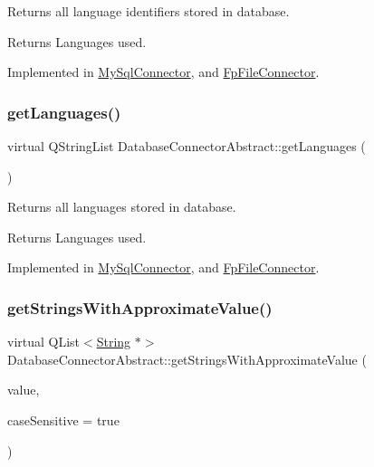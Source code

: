 Returns all language identifiers stored in database. 

\begin{DoxyReturn}{Returns}
Languages used. 
\end{DoxyReturn}


Implemented in \mbox{\hyperlink{classMySqlConnector_a3493828360c7edd217461e040fc1b00e}{My\+Sql\+Connector}}, and \mbox{\hyperlink{classFpFileConnector_a290016844ec3093b1c58db33fc86cd0a}{Fp\+File\+Connector}}.

\mbox{\label{classDatabaseConnectorAbstract_a77ff263d407366e54f3e8512c575ff5e}} 
\subsubsection{\texorpdfstring{get\+Languages()}{getLanguages()}}
{\footnotesize\ttfamily virtual Q\+String\+List Database\+Connector\+Abstract\+::get\+Languages (\begin{DoxyParamCaption}{ }\end{DoxyParamCaption})\hspace{0.3cm}{\ttfamily [pure virtual]}}



Returns all languages stored in database. 

\begin{DoxyReturn}{Returns}
Languages used. 
\end{DoxyReturn}


Implemented in \mbox{\hyperlink{classMySqlConnector_a83be1a4d67e509b6604629660eb7c4a0}{My\+Sql\+Connector}}, and \mbox{\hyperlink{classFpFileConnector_a82b6ae6887737cfea3b982cb0874424e}{Fp\+File\+Connector}}.

\mbox{\label{classDatabaseConnectorAbstract_a5b0f30372ca105a94073267e969b74ee}} 
\subsubsection{\texorpdfstring{get\+Strings\+With\+Approximate\+Value()}{getStringsWithApproximateValue()}}
{\footnotesize\ttfamily virtual Q\+List$<$\mbox{\hyperlink{classString}{String}} $\ast$$>$ Database\+Connector\+Abstract\+::get\+Strings\+With\+Approximate\+Value (\begin{DoxyParamCaption}\item[{const Q\+String \&}]{value,  }\item[{bool}]{case\+Sensitive = {\ttfamily true} }\end{DoxyParamCaption})\hspace{0.3cm}{\ttfamily [pure virtual]}}



